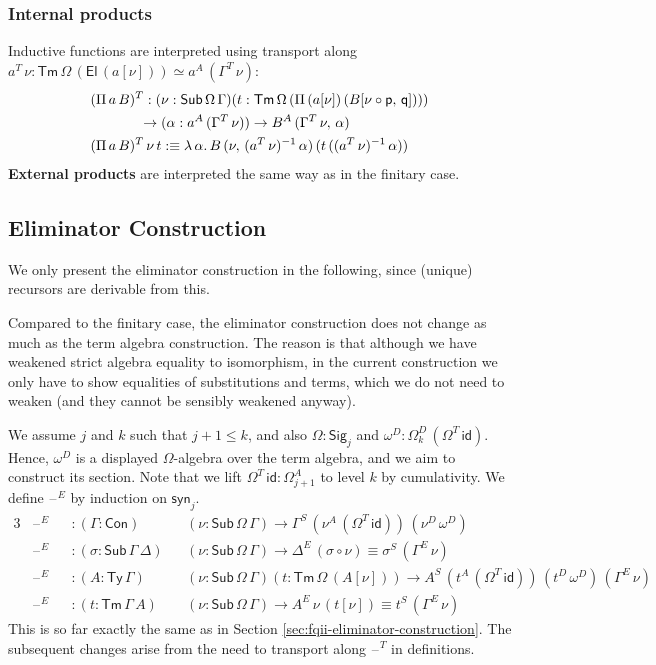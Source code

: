 \documentclass[12pt,a4paper,twoside,openany]{book}
\theoremstyle{remark}
\theoremstyle{definition}
\theoremstyle{theorem}
\newcommand{\id}{\mathsf{id}}
\newcommand{\Con}{\mathsf{Con}}
\newcommand{\Sub}{\mathsf{Sub}}
\newcommand{\Tm}{\mathsf{Tm}}
\newcommand{\Ty}{\mathsf{Ty}}
\newcommand{\El}{\mathsf{El}}
\newcommand{\blank}{\mathord{\hspace{1pt}\text{--}\hspace{1pt}}}
\newcommand{\Pii}{\Pi}
\newcommand{\Sig}{\mathsf{Sig}}
\newcommand{\p}{\mathsf{p}}
\newcommand{\q}{\mathsf{q}}
\newcommand{\syn}{\mathsf{syn}}
\newcommand{\defn}{:\equiv}
\begin{document}
\subsubsection{Internal products}
Inductive functions are interpreted using transport along $a^T\,\nu :
\Tm\,\Omega\,(\El\,(a[\nu])) \simeq a^A\,(\Gamma^T\,\nu)$:
\begin{alignat*}{3}
  &(\Pii\,a\,B)^T : (\nu : \Sub\,\Omega\,\Gamma)(t : \Tm\,\Omega\,(\Pii\,(a[\nu])\,(B[\nu\circ\p,\,\q])))\\
  & \hspace{3.5em}\to (\alpha : a^A\,(\Gamma^T\,\nu)) \to B^A\,(\Gamma^T\,\nu,\,\alpha)\\
  &(\Pii\,a\,B)^T\,\nu\,t \defn \lambda\,\alpha.\,
         B\,(\nu,\,(a^T\,\nu)^{-1}\,\alpha)\,(t\,((a^T\,\nu)^{-1}\,\alpha))
\end{alignat*}
\textbf{External products} are interpreted the same way as in the finitary case.

\subsection{Eliminator Construction}

We only present the eliminator construction in the following, since (unique)
recursors are derivable from this.

Compared to the finitary case, the eliminator construction does not change as
much as the term algebra construction. The reason is that although we have
weakened strict algebra equality to isomorphism, in the current construction we
only have to show equalities of substitutions and terms, which we do not need to
weaken (and they cannot be sensibly weakened anyway).

We assume $j$ and $k$ such that $ j + 1 \leq k$, and also $\Omega : \Sig_j$ and
$\omega^D : \Omega^D_k\,(\Omega^T\,\id)$. Hence, $\omega^D$ is a displayed
$\Omega$-algebra over the term algebra, and we aim to construct its section.
Note that we lift $\Omega^T\,\id : \Omega^A_{j+1}$ to level $k$ by cumulativity.
We define $\blank^E$ by induction on $\syn_j$.
\begin{alignat*}{3}
  &\blank^E &&: (\Gamma : \Con)&&(\nu : \Sub\,\Omega\,\Gamma) \to \Gamma^S\,(\nu^A\,(\Omega^T\,\id))\,(\nu^D\,\omega^D)\\
  &\blank^E &&: (\sigma : \Sub\,\Gamma\,\Delta)&&(\nu : \Sub\,\Omega\,\Gamma) \to \Delta^E\,(\sigma \circ \nu) \equiv \sigma^S\,(\Gamma^E\,\nu)\\
  &\blank^E &&: (A : \Ty\,\Gamma)&&(\nu : \Sub\,\Omega\,\Gamma)(t : \Tm\,\Omega\,(A[\nu]))
     \to A^S\,(t^A\,(\Omega^T\,\id))\,(t^D\,\omega^D)\,(\Gamma^E\,\nu)\\
  &\blank^E &&: (t : \Tm\,\Gamma\,A)&&(\nu : \Sub\,\Omega\,\Gamma) \to A^E\,\nu\,(t[\nu]) \equiv t^S\,(\Gamma^E\,\nu)
\end{alignat*}
This is so far exactly the same as in Section
\ref{sec:fqii-eliminator-construction}. The subsequent changes arise from
the need to transport along $\blank^T$ in definitions.
\end{document}
